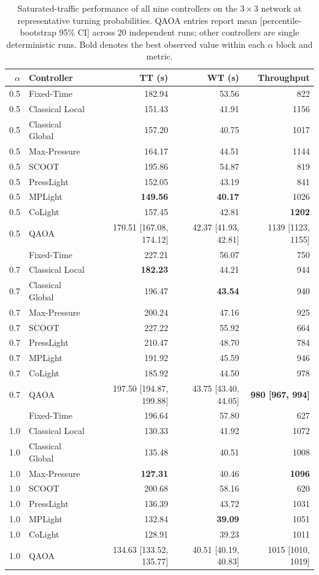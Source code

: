 \begin{table}[htbp]
\centering
\scriptsize
\setlength{\tabcolsep}{4pt}
\caption{Saturated-traffic performance of all nine controllers on the $3\times3$ network at representative turning probabilities. QAOA entries report mean [percentile-bootstrap 95\% CI] across 20 independent runs; other controllers are single deterministic runs. Bold denotes the best observed value within each $\alpha$ block and metric.}
\label{tab:saturated-3x3-all-controller-summary}
\begin{tabular}{rlrrr}
\toprule
$\alpha$ & Controller & TT (s) & WT (s) & Throughput \\
\midrule
0.5 & Fixed-Time & 182.94 & 53.56 & 822 \\
0.5 & Classical Local & 151.43 & 41.91 & 1156 \\
0.5 & Classical Global & 157.20 & 40.75 & 1017 \\
0.5 & Max-Pressure & 164.17 & 44.51 & 1144 \\
0.5 & SCOOT & 195.86 & 54.87 & 819 \\
0.5 & PressLight & 152.05 & 43.19 & 841 \\
0.5 & MPLight & \textbf{149.56} & \textbf{40.17} & 1026 \\
0.5 & CoLight & 157.45 & 42.81 & \textbf{1202} \\
0.5 & QAOA & 170.51 [167.08, 174.12] & 42.37 [41.93, 42.81] & 1139 [1123, 1155] \\
\addlinespace
0.7 & Fixed-Time & 227.21 & 56.07 & 750 \\
0.7 & Classical Local & \textbf{182.23} & 44.21 & 944 \\
0.7 & Classical Global & 196.47 & \textbf{43.54} & 940 \\
0.7 & Max-Pressure & 200.24 & 47.16 & 925 \\
0.7 & SCOOT & 227.22 & 55.92 & 664 \\
0.7 & PressLight & 210.47 & 48.70 & 784 \\
0.7 & MPLight & 191.92 & 45.59 & 946 \\
0.7 & CoLight & 185.92 & 44.50 & 978 \\
0.7 & QAOA & 197.50 [194.87, 199.88] & 43.75 [43.40, 44.05] & \textbf{980 [967, 994]} \\
\addlinespace
1.0 & Fixed-Time & 196.64 & 57.80 & 627 \\
1.0 & Classical Local & 130.33 & 41.92 & 1072 \\
1.0 & Classical Global & 135.48 & 40.51 & 1008 \\
1.0 & Max-Pressure & \textbf{127.31} & 40.46 & \textbf{1096} \\
1.0 & SCOOT & 200.68 & 58.16 & 620 \\
1.0 & PressLight & 136.39 & 43.72 & 1031 \\
1.0 & MPLight & 132.84 & \textbf{39.09} & 1051 \\
1.0 & CoLight & 128.91 & 39.23 & 1011 \\
1.0 & QAOA & 134.63 [133.52, 135.77] & 40.51 [40.19, 40.83] & 1015 [1010, 1019] \\
\bottomrule
\end{tabular}
\end{table}


